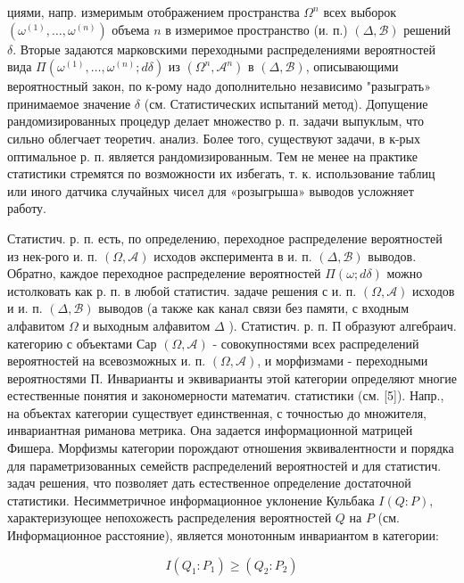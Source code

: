 \documentclass[10pt]{article}
\begin{document}
циями, напр. измеримым отображением пространства $\Omega^{n}$ всех выборок $\left(\omega^{(1)}, \ldots, \omega^{(n)}\right)$ объема $n$ в измеримое пространство (и. п.) $(\Delta, \mathscr{B})$ решений $\delta$. Вторые задаются марковскими переходными распределениями вероятностей вида $\Pi\left(\omega^{(1)}, \ldots, \omega^{(n)} ; d \delta\right)$ из $\left(\Omega^{n}, \mathscr{A}^{n}\right)$ в $(\Delta, \mathscr{B})$, описывающими вероятностный закон, по к-рому надо дополнительно независимо "разыграть» принимаемое значение $\delta$ (см. Статистических испытаний метод). Допущение рандомизированных процедур делает множество р. п. задачи выпуклым, что сильно облегчает теоретич. анализ. Более того, существуют задачи, в к-рых оптимальное р. п. является рандомизированным. Тем не менее на практике статистики стремятся по возможности их избегать, т. к. использование таблиц или иного датчика случайных чисел для «розыгрыша» выводов усложняет работу.



Статистич. р. п. есть, по определению, переходное распределение вероятностей из нек-рого и. п. $(\Omega, \mathcal{A})$ исходов әксперимента в и. п. $(\Delta, \mathscr{B})$ выводов. Обратно, каждое переходное распределение вероятностей $\Pi(\omega ; d \delta)$ можно истолковать как р. п. в любой статистич. задаче решения с и. п. $(\Omega, \mathcal{A})$ исходов и и. п. $(\Delta, \mathscr{B})$ выводов (а также как канал связи без памяти, с входным алфавитом $\Omega$ и выходным алфавитом $\Delta$ ). Статистич. р. п. П образуют алгебраич. категорию с объектами Сар $(\Omega, \mathcal{A})$ - совокупностями всех распределений вероятностей на всевозможных и. п. $(\Omega, \mathcal{A})$, и морфизмами - переходными вероятностями П. Инварианты и эквиварианты этой категории определяют многие естественные понятия и закономерности математич. статистики (см. [5]). Напр., на объектах категории существует единственная, с точностью до множителя, инвариантная риманова метрика. Она задается информационной матрицей Фишера. Морфизмы категории порождают отношения эквивалентности и порядка для параметризованных семейств распределений вероятностей и для статистич. задач решения, что позволяет дать естественное определение достаточной статистики. Несимметричное информационное уклонение Кульбака $I(Q: P)$, характеризующее непохожесть распределения вероятностей $Q$ на $P$ (см. Информационное расстояние), является монотонным инвариантом в категории:



\[

I\left(Q_{1}: P_{1}\right) \geqslant\left(Q_{2}: P_{2}\right)

\]
\end{document}
